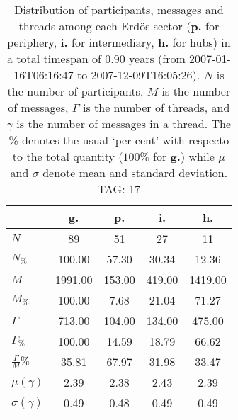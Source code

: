 \begin{table}[h!]
\begin{center}
\begin{tabular}{| l | c | c | c | c |}\hline
 & g. & p. & i. & h. \\\hline
$N$ & 89  & 51  & 27  & 11 \\\hline
$N_{\%}$ & 100.00  & 57.30  & 30.34  & 12.36 \\\hline
$M$ & 1991.00  & 153.00  & 419.00  & 1419.00 \\\hline
$M_{\%}$ & 100.00  & 7.68  & 21.04  & 71.27 \\\hline
$\Gamma$ & 713.00  & 104.00  & 134.00  & 475.00 \\\hline
$\Gamma_{\%}$ & 100.00  & 14.59  & 18.79  & 66.62 \\\hline
$\frac{\Gamma}{M}\%$ & 35.81  & 67.97  & 31.98  & 33.47 \\\hline
$\mu(\gamma)$ & 2.39  & 2.38  & 2.43  & 2.39 \\\hline
$\sigma(\gamma)$ & 0.49  & 0.48  & 0.49  & 0.49 \\\hline
\end{tabular}
\caption{Distribution of participants, messages and threads among each Erd\"os sector ({\bf p.} for periphery, {\bf i.} for intermediary, 
    {\bf h.} for hubs) in a total timespan of 0.90 years (from 2007-01-16T06:16:47 to 2007-12-09T16:05:26). $N$ is the number of participants, $M$ is the number of messages, $\Gamma$ is the number of threads, and $\gamma$ is the number of messages in a thread.
    The \% denotes the usual `per cent' with respecto to the total quantity ($100\%$ for {\bf g.})
    while $\mu$ and $\sigma$ denote mean and standard deviation. TAG: 17}
\end{center}
\end{table}